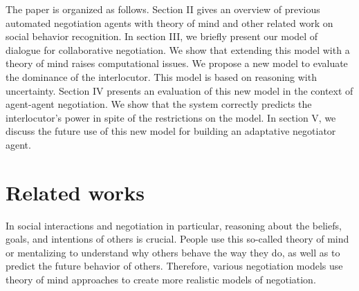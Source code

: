 \documentclass[sigconf]{aamas}  %
\begin{document}
%	
%	
%	
%	
%	
%	
%	
	The paper is organized as follows. Section II gives an overview of previous automated negotiation agents with theory of mind and other related work on social behavior recognition. In section III, we briefly present our model of dialogue for collaborative negotiation. We show that extending this model with a theory of mind raises computational issues. We propose a new model to evaluate the dominance of the interlocutor. This model is based on reasoning with uncertainty. Section IV presents an evaluation of this new model in the context of agent-agent negotiation. We show that the system correctly predicts the interlocutor's power in spite of the restrictions on the model. In section V, we discuss the future use of this new model for building an adaptative negotiator agent.
	
	
	\section{Related works}
	
	In social interactions and negotiation in particular, reasoning about the beliefs, goals, and intentions of others is crucial. People use this so-called theory of mind \cite{premack1978does} or mentalizing to understand why others behave the way they do, as well as to predict the future behavior of others. Therefore, various negotiation models use theory of mind approaches to create  more realistic models of negotiation. 
	
\end{document}

